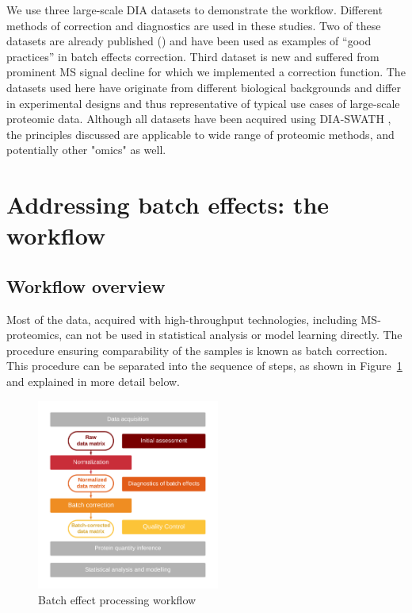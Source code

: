 \documentclass[num-refs]{wiley-article}
\begin{document}
We use three large-scale DIA datasets to demonstrate the workflow. Different methods of correction and diagnostics are used in these studies. Two of these datasets are already published (\cite{Collins2017, Sajic2018}) and have been used as examples of “good practices” in batch effects correction. Third dataset is new and suffered from prominent MS signal decline for which we implemented a correction function. The datasets used here have originate from different biological backgrounds and differ in experimental designs and thus representative of typical use cases of large-scale proteomic data. Although all datasets have been acquired using DIA-SWATH \cite{Gillet:2012aa}, the principles discussed are applicable to wide range of proteomic methods, and potentially other "omics" as well.

\section{Addressing batch effects: the workflow}
\subsection{Workflow overview}
Most of the data, acquired with high-throughput technologies, including MS-proteomics, can not be used in statistical analysis or model learning directly. The procedure ensuring comparability of the samples is known as batch correction. This procedure can be separated into the sequence of steps, as shown in Figure~\ref{fig:batch_fig1_workflow} and explained in more detail below.  
\begin{figure}[bt]
	\center
	\includegraphics[width=6cm]{figures/Fig0_workflow_staircase}
	\caption[Batch effect correction workflow]
	{Batch effect processing workflow}
	\label{fig:batch_fig1_workflow}
\end{figure}
\end{document}
